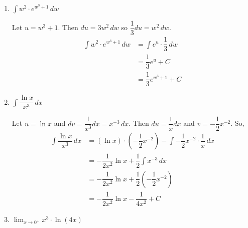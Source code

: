 \documentclass{article}
\begin{document}
\begin{enumerate}
\begin{enumerate}
      \begin{solution}
          Let $u=\sin x$. Then $du = \cos x\, dx$. So,
          \begin{align*}
              \displaystyle \int 5\sin^2(x)\cos(x)\, dx &= \displaystyle \int 5u^2\, du\\
              &= 5\cdot \dfrac{1}{3}u^3 + C\\
             &= \boxed{\dfrac{5}{3}\sin^3 x +C}
          \end{align*}
      \end{solution}
      \vfill
      \item $\displaystyle \int  w^2\cdot e^{w^3 + 1}\, dw$
      
      \begin{solution}
          Let $u=w^3 + 1$. Then $du=3w^2\, dw$ so $\dfrac{1}{3}du=w^2\, dw$.
          \begin{align*}
              \displaystyle \int  w^2\cdot e^{w^3 + 1}\, dw &= \displaystyle \int  e^u \cdot \dfrac{1}{3}\, dw\\
              &= \dfrac{1}{3}e^u+C\\
             &= \boxed{\dfrac{1}{3}e^{w^3+1}+C}
          \end{align*}
      \end{solution}
      \vfill 
      \item $\displaystyle \int \dfrac{\ln x}{x^3}\, dx$

      \begin{solution}
          Let $u=\ln x$ and $dv=\dfrac{1}{x^3}dx = x^{-3}\, dx$. Then $du=\dfrac{1}{x} dx$ and $v = -\dfrac{1}{2} x^{-2}$. So,
          \begin{align*}
             \displaystyle \int \dfrac{\ln x}{x^3}\, dx &=  (\ln x) \cdot \left(-\dfrac{1}{2} x^{-2}\right)- \displaystyle \int -\dfrac{1}{2} x^{-2} \cdot \dfrac{1}{x}\, dx\\
             &= -\dfrac{1}{2x^2}\ln x + \dfrac{1}{2}\displaystyle \int x^{-3} \, dx\\
             &= -\dfrac{1}{2x^2}\ln x + \dfrac{1}{2}\left(-\dfrac{1}{2}x^{-2}\right)\\ &= \boxed{-\dfrac{1}{2x^2}\ln x - \dfrac{1}{4x^2} +C}
          \end{align*}
      \end{solution}
      \vfill

    \newpage 

    \item $\displaystyle \lim_{x \to 0^{+}} x^3 \cdot \ln(4x)$


\end{enumerate}
\end{enumerate}
\end{document}
